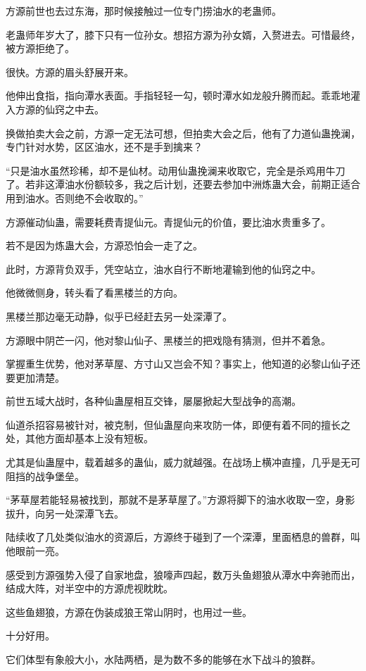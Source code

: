 \begin{this_body}
方源前世也去过东海，那时候接触过一位专门捞油水的老蛊师。

老蛊师年岁大了，膝下只有一位孙女。想招方源为孙女婿，入赘进去。可惜最终，被方源拒绝了。

很快。方源的眉头舒展开来。

他伸出食指，指向潭水表面。手指轻轻一勾，顿时潭水如龙般升腾而起。乖乖地灌入方源的仙窍之中去。

换做拍卖大会之前，方源一定无法可想，但拍卖大会之后，他有了力道仙蛊挽澜，专门针对水势，区区油水，还不是手到擒来？

“只是油水虽然珍稀，却不是仙材。动用仙蛊挽澜来收取它，完全是杀鸡用牛刀了。若非这潭油水份额较多，我之后计划，还要去参加中洲炼蛊大会，前期正适合用到油水。否则绝不会收取的。”

方源催动仙蛊，需要耗费青提仙元。青提仙元的价值，要比油水贵重多了。

若不是因为炼蛊大会，方源恐怕会一走了之。

此时，方源背负双手，凭空站立，油水自行不断地灌输到他的仙窍之中。

他微微侧身，转头看了看黑楼兰的方向。

黑楼兰那边毫无动静，似乎已经赶去另一处深潭了。

方源眼中阴芒一闪，他对黎山仙子、黑楼兰的把戏隐有猜测，但并不着急。

掌握重生优势，他对茅草屋、方寸山又岂会不知？事实上，他知道的必黎山仙子还要更加清楚。

前世五域大战时，各种仙蛊屋相互交锋，屡屡掀起大型战争的高潮。

仙道杀招容易被针对，被克制，但仙蛊屋向来攻防一体，即便有着不同的擅长之处，其他方面却基本上没有短板。

尤其是仙蛊屋中，载着越多的蛊仙，威力就越强。在战场上横冲直撞，几乎是无可阻挡的战争堡垒。

“茅草屋若能轻易被找到，那就不是茅草屋了。”方源将脚下的油水收取一空，身影拔升，向另一处深潭飞去。

陆续收了几处类似油水的资源后，方源终于碰到了一个深潭，里面栖息的兽群，叫他眼前一亮。

感受到方源强势入侵了自家地盘，狼嚎声四起，数万头鱼翅狼从潭水中奔驰而出，结成大阵，对半空中的方源虎视眈眈。

这些鱼翅狼，方源在伪装成狼王常山阴时，也用过一些。

十分好用。

它们体型有象般大小，水陆两栖，是为数不多的能够在水下战斗的狼群。


\end{this_body}
